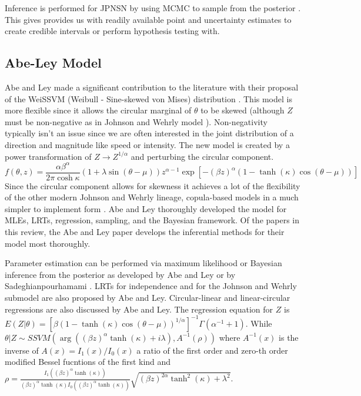 Inference is performed for JPNSN by using MCMC to sample from the posterior \cite{mastrantonio_joint_2018}. This gives provides us with readily available point and uncertainty estimates to create credible intervals or perform hypothesis testing with.

\subsection{Abe-Ley Model}\label{mod_AL}

Abe and Ley made a significant contribution to the literature with their proposal of the WeiSSVM (Weibull - Sine-skewed von Mises) distribution \cite{abe_tractable_2017}. This model is more flexible since it allows the circular marginal of $\theta$ to be skewed (although $Z$ must be non-negative as in Johnson and Wehrly model \cite{johnson_angular-linear_1978}). Non-negativity typically isn't an issue since we are often interested in the joint distribution of a direction and magnitude like speed or intensity. The new model is created by a power transformation of $Z \rightarrow Z^{1/\alpha}$ and perturbing the circular component. \[f(\theta, z) = \frac{\alpha \beta^{\alpha}}{2\pi \cosh \kappa} (1 + \lambda \sin(\theta - \mu)) z^{\alpha - 1} \exp\left[-(\beta z)^{\alpha} (1 - \tanh(\kappa)\cos(\theta - \mu))\right]\] Since the circular component allows for skewness it achieves a lot of the flexibility of the other modern Johnson and Wehrly lineage, copula-based models \cite{fernandez-duran_models_2007}\cite{garcia-portugues_exploring_2013}\cite{carnicero_non-parametric_2013} in a much simpler to implement form \cite{abe_tractable_2017}. Abe and Ley thoroughly developed the model for MLEs, LRTs, regression, sampling, and the Bayesian framework. Of the papers in this review, the Abe and Ley paper develops the inferential methods for their model most thoroughly. 

Parameter estimation can be performed via maximum likelihood or Bayesian inference from the posterior as developed by Abe and Ley \cite{abe_tractable_2017} or by Sadeghianpourhamami \cite{sadeghianpourhamami_bayesian_2019}. LRTs for independence and for the Johnson and Wehrly submodel are also proposed by Abe and Ley. Circular-linear and linear-circular regressions are also discussed by Abe and Ley. The regression equation for $Z$ is $E(Z | \theta) = \left[\beta (1 - \tanh(\kappa)\cos(\theta - \mu))^{1/\alpha}\right]^{-1} \Gamma(\alpha^{-1} + 1)$. While $\theta | Z \sim SSVM(\arg ((\beta z)^\alpha \tanh(\kappa) + i\lambda), A^{-1}(\rho))$ where $A^{-1}(x)$ is the inverse of $A(x) = I_1(x) / I_0(x)$ a ratio of the first order and zero-th order modified Bessel fucntions of the first kind and $\rho = \frac{I_1((\beta z)^\alpha \tanh(\kappa))}{(\beta z)^\alpha \tanh(\kappa) I_0((\beta z)^\alpha \tanh(\kappa))} \sqrt{(\beta z)^{2\alpha} \tanh^2(\kappa) + \lambda^2}$.

